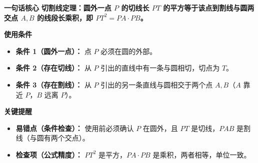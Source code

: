 \begin{summarybox}
	\textbf{\textcolor{CSummary}{一句话核心}}
	\textbf{切割线定理：圆外一点 $P$ 的切线长 $PT$ 的平方等于该点到割线与圆两交点 $A,B$ 的线段长乘积，即 $PT^{2}=PA\cdot PB$。}

	\medskip
	\textbf{\textcolor{CSummary}{使用条件}}
	\begin{itemize}[leftmargin=*, itemsep=0.5em, topsep=0.4em]
		\item \textbf{条件 1（圆外一点）：} 点 $P$ 必须在圆的外部。
		\item \textbf{条件 2（存在切线）：} 从 $P$ 引出的直线中有一条与圆相切，切点为 $T$。
		\item \textbf{条件 3（存在割线）：} 从 $P$ 引出的另一条直线与圆相交于两个点 $A,B$（$A$ 靠近 $P$，$B$ 远离 $P$）。
	\end{itemize}

	\medskip
	\textbf{\textcolor{CSummary}{关键提醒}}
	\begin{itemize}[leftmargin=*, itemsep=0.5em, topsep=0.4em]
		\item \textbf{易错点（条件检查）：} 使用前必须确认 $P$ 在圆外，且 $PT$ 是切线，$PAB$ 是割线（与圆有两个交点）。
		\item \textbf{检查项（公式精度）：} $PT^{2}$ 是平方，$PA\cdot PB$ 是乘积，两者相等，单位一致。
	\end{itemize}

\end{summarybox}
